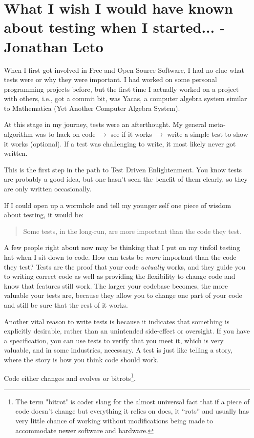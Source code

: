 \section{What I wish I would have known about testing when I started... - Jonathan Leto}
When I first got involved in Free and Open Source Software, I had no clue what tests were or why they were important. I had worked on some personal programming projects before, but the first time I actually worked on a project with others, i.e., got a commit bit, was Yacas, a computer algebra system similar to Mathematica (Yet Another Computer Algebra System).

At this stage in my journey, tests were an afterthought. My general meta-algorithm was to hack on code $\rightarrow$ see if it works $\rightarrow$ write a simple test to show it works (optional). If a test was challenging to write, it most likely never got written.

This is the first step in the path to Test Driven Enlightenment. You know tests are probably a good idea, but one hasn't seen the benefit of them clearly, so they are only written occasionally.

If I could open up a wormhole and tell my younger self one piece of wisdom about testing, it would be:
\begin{quote}
Some tests, in the long-run, are more important than the code they test.                                                                        \end{quote}

A few people right about now may be thinking that I put on my tinfoil testing hat when I sit down to code. How can tests be \emph{more} important than the code they test? Tests are the proof that your code \emph{actually} works, and they guide you to writing correct code as well as providing the flexibility to change code and know that features still work. The larger your codebase becomes, the more valuable your tests are, because they allow you to change one part of your code and still be sure that the rest of it works.

Another vital reason to write tests is because it indicates that something is explicitly desirable, rather than an unintended side-effect or oversight. If you have a specification, you can use tests to verify that you meet it, which is very valuable, and in some industries, necessary. A test is just like telling a story, where the story is how you think code should work.

Code either changes and evolves or bitrots\footnote{The term "bitrot" is coder slang for the almost universal fact that if a piece of code doesn't change but everything it relies on does, it ``rots'' and usually has very little chance of working without modifications being made to accommodate newer software and hardware.}.

